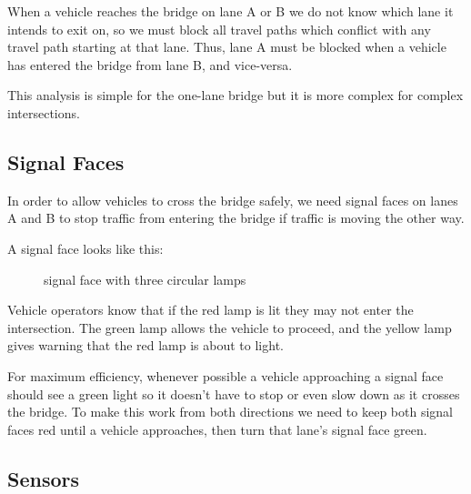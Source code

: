 \documentclass[letterpaper,twoside]{article}
\begin{document}
When a vehicle reaches the bridge on lane A or B we do not
know which lane it intends to exit on, so we must block all travel paths
which conflict with any travel path starting at that lane.  Thus,
lane A must be blocked when a vehicle has entered the bridge from lane B,
and vice-versa.

This analysis is simple for the one-lane bridge but it is more complex
for complex intersections.

\subsection{Signal Faces}

In order to allow vehicles to cross the bridge safely, we need signal
faces on lanes A and B to stop traffic from entering the bridge if
traffic is moving the other way.

A signal face looks like this:

\begin{figure}[H]
           {\caption{signal face with three circular lamps}
             \label{fig:signal_ccc}}
\end{figure}

Vehicle operators know that if the red lamp is lit they may not
enter the intersection.  The green lamp allows the vehicle to
proceed, and the yellow lamp gives warning that the red lamp
is about to light.

For maximum efficiency, whenever possible a vehicle approaching
a signal face should see a green light so it doesn't have to
stop or even slow down as it crosses the bridge.  To make this
work from both directions we need to keep both signal faces red
until a vehicle approaches, then turn that lane's signal face
green.

\subsection{Sensors}
\end{document}
